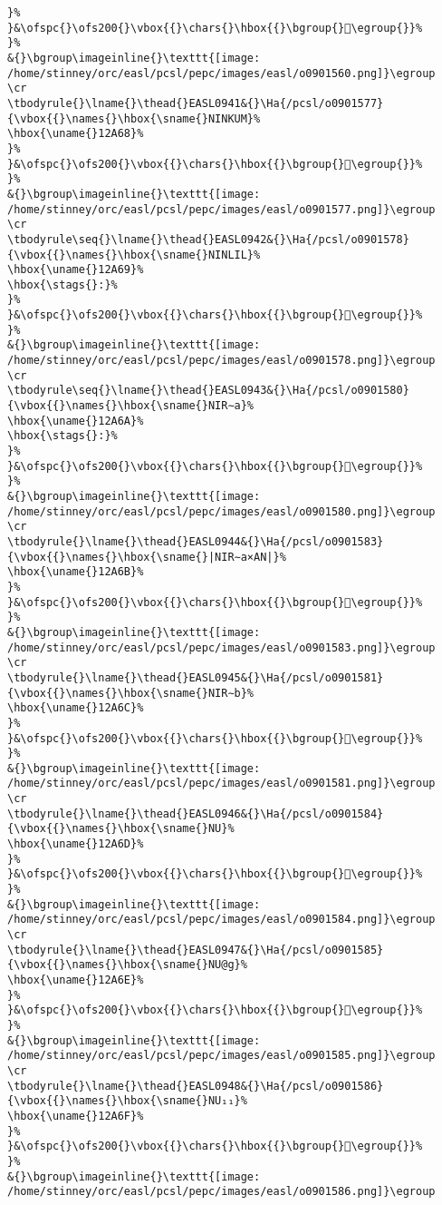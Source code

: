 \begin{verbatim}
}%
}&\ofspc{}\ofs200{}\vbox{{}\chars{}\hbox{{}\bgroup{}𒩦\egroup{}}%
}%
&{}\bgroup\imageinline{}\texttt{[image: /home/stinney/orc/easl/pcsl/pepc/images/easl/o0901560.png]}\egroup
\cr
\tbodyrule{}\lname{}\thead{}EASL0941&{}\Ha{/pcsl/o0901577}{\vbox{{}\names{}\hbox{\sname{}NINKUM}%
\hbox{\uname{}12A68}%
}%
}&\ofspc{}\ofs200{}\vbox{{}\chars{}\hbox{{}\bgroup{}𒩨\egroup{}}%
}%
&{}\bgroup\imageinline{}\texttt{[image: /home/stinney/orc/easl/pcsl/pepc/images/easl/o0901577.png]}\egroup
\cr
\tbodyrule\seq{}\lname{}\thead{}EASL0942&{}\Ha{/pcsl/o0901578}{\vbox{{}\names{}\hbox{\sname{}NINLIL}%
\hbox{\uname{}12A69}%
\hbox{\stags{}:}%
}%
}&\ofspc{}\ofs200{}\vbox{{}\chars{}\hbox{{}\bgroup{}𒩩\egroup{}}%
}%
&{}\bgroup\imageinline{}\texttt{[image: /home/stinney/orc/easl/pcsl/pepc/images/easl/o0901578.png]}\egroup
\cr
\tbodyrule\seq{}\lname{}\thead{}EASL0943&{}\Ha{/pcsl/o0901580}{\vbox{{}\names{}\hbox{\sname{}NIR∼a}%
\hbox{\uname{}12A6A}%
\hbox{\stags{}:}%
}%
}&\ofspc{}\ofs200{}\vbox{{}\chars{}\hbox{{}\bgroup{}𒩪\egroup{}}%
}%
&{}\bgroup\imageinline{}\texttt{[image: /home/stinney/orc/easl/pcsl/pepc/images/easl/o0901580.png]}\egroup
\cr
\tbodyrule{}\lname{}\thead{}EASL0944&{}\Ha{/pcsl/o0901583}{\vbox{{}\names{}\hbox{\sname{}|NIR∼a×AN|}%
\hbox{\uname{}12A6B}%
}%
}&\ofspc{}\ofs200{}\vbox{{}\chars{}\hbox{{}\bgroup{}𒩫\egroup{}}%
}%
&{}\bgroup\imageinline{}\texttt{[image: /home/stinney/orc/easl/pcsl/pepc/images/easl/o0901583.png]}\egroup
\cr
\tbodyrule{}\lname{}\thead{}EASL0945&{}\Ha{/pcsl/o0901581}{\vbox{{}\names{}\hbox{\sname{}NIR∼b}%
\hbox{\uname{}12A6C}%
}%
}&\ofspc{}\ofs200{}\vbox{{}\chars{}\hbox{{}\bgroup{}𒩬\egroup{}}%
}%
&{}\bgroup\imageinline{}\texttt{[image: /home/stinney/orc/easl/pcsl/pepc/images/easl/o0901581.png]}\egroup
\cr
\tbodyrule{}\lname{}\thead{}EASL0946&{}\Ha{/pcsl/o0901584}{\vbox{{}\names{}\hbox{\sname{}NU}%
\hbox{\uname{}12A6D}%
}%
}&\ofspc{}\ofs200{}\vbox{{}\chars{}\hbox{{}\bgroup{}𒩭\egroup{}}%
}%
&{}\bgroup\imageinline{}\texttt{[image: /home/stinney/orc/easl/pcsl/pepc/images/easl/o0901584.png]}\egroup
\cr
\tbodyrule{}\lname{}\thead{}EASL0947&{}\Ha{/pcsl/o0901585}{\vbox{{}\names{}\hbox{\sname{}NU@g}%
\hbox{\uname{}12A6E}%
}%
}&\ofspc{}\ofs200{}\vbox{{}\chars{}\hbox{{}\bgroup{}𒩮\egroup{}}%
}%
&{}\bgroup\imageinline{}\texttt{[image: /home/stinney/orc/easl/pcsl/pepc/images/easl/o0901585.png]}\egroup
\cr
\tbodyrule{}\lname{}\thead{}EASL0948&{}\Ha{/pcsl/o0901586}{\vbox{{}\names{}\hbox{\sname{}NU₁₁}%
\hbox{\uname{}12A6F}%
}%
}&\ofspc{}\ofs200{}\vbox{{}\chars{}\hbox{{}\bgroup{}𒩯\egroup{}}%
}%
&{}\bgroup\imageinline{}\texttt{[image: /home/stinney/orc/easl/pcsl/pepc/images/easl/o0901586.png]}\egroup

\end{verbatim}

